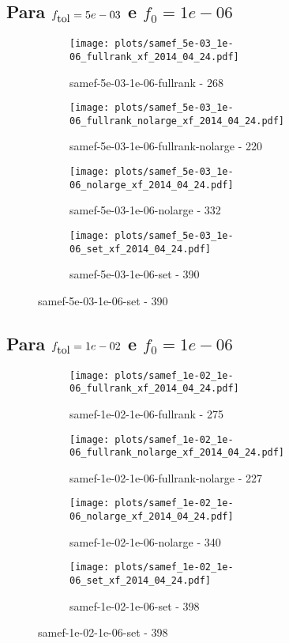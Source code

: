 \newpage
\subsection{Para $f_{\mbox{tol}} = 5e-03$ e $f_0 = 1e-06$}

\begin{figure}[H]
  \centering
  \begin{subfigure}{0.48\textwidth}
    \texttt{[image: plots/samef\_5e-03\_1e-06\_fullrank\_xf\_2014\_04\_24.pdf]}
    \caption{samef-5e-03-1e-06-fullrank - 268}
  \end{subfigure}
  \begin{subfigure}{0.48\textwidth}
    \texttt{[image: plots/samef\_5e-03\_1e-06\_fullrank\_nolarge\_xf\_2014\_04\_24.pdf]}
    \caption{samef-5e-03-1e-06-fullrank-nolarge - 220}
  \end{subfigure}
  \begin{subfigure}{0.48\textwidth}
    \texttt{[image: plots/samef\_5e-03\_1e-06\_nolarge\_xf\_2014\_04\_24.pdf]}
    \caption{samef-5e-03-1e-06-nolarge - 332}
  \end{subfigure}
  \begin{subfigure}{0.48\textwidth}
    \texttt{[image: plots/samef\_5e-03\_1e-06\_set\_xf\_2014\_04\_24.pdf]}
    \caption{samef-5e-03-1e-06-set - 390}
  \end{subfigure}
\end{figure}

\newpage
\subsection{Para $f_{\mbox{tol}} = 1e-02$ e $f_0 = 1e-06$}

\begin{figure}[H]
  \centering
  \begin{subfigure}{0.48\textwidth}
    \texttt{[image: plots/samef\_1e-02\_1e-06\_fullrank\_xf\_2014\_04\_24.pdf]}
    \caption{samef-1e-02-1e-06-fullrank - 275}
  \end{subfigure}
  \begin{subfigure}{0.48\textwidth}
    \texttt{[image: plots/samef\_1e-02\_1e-06\_fullrank\_nolarge\_xf\_2014\_04\_24.pdf]}
    \caption{samef-1e-02-1e-06-fullrank-nolarge - 227}
  \end{subfigure}
  \begin{subfigure}{0.48\textwidth}
    \texttt{[image: plots/samef\_1e-02\_1e-06\_nolarge\_xf\_2014\_04\_24.pdf]}
    \caption{samef-1e-02-1e-06-nolarge - 340}
  \end{subfigure}
  \begin{subfigure}{0.48\textwidth}
    \texttt{[image: plots/samef\_1e-02\_1e-06\_set\_xf\_2014\_04\_24.pdf]}
    \caption{samef-1e-02-1e-06-set - 398}
  \end{subfigure}
\end{figure}

